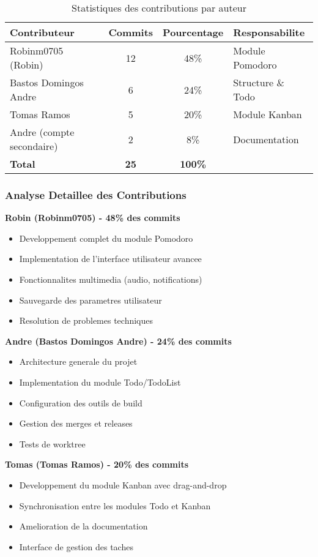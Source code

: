 \documentclass[12pt,a4paper]{article}
\begin{document}
\begin{table}[H]
\centering
\begin{tabular}{|l|c|c|l|}
\hline
\textbf{Contributeur} & \textbf{Commits} & \textbf{Pourcentage} & \textbf{Responsabilite} \\
\hline
Robinm0705 (Robin) & 12 & 48\% & Module Pomodoro \\
Bastos Domingos Andre & 6 & 24\% & Structure \& Todo \\
Tomas Ramos & 5 & 20\% & Module Kanban \\
Andre (compte secondaire) & 2 & 8\% & Documentation \\
\hline
\textbf{Total} & \textbf{25} & \textbf{100\%} & \\
\hline
\end{tabular}
\caption{Statistiques des contributions par auteur}
\label{tab:commits-stats}
\end{table}

\subsubsection{Analyse Detaillee des Contributions}

\textbf{Robin (Robinm0705) - 48\% des commits}
\begin{itemize}
    \item Developpement complet du module Pomodoro
    \item Implementation de l'interface utilisateur avancee
    \item Fonctionnalites multimedia (audio, notifications)
    \item Sauvegarde des parametres utilisateur
    \item Resolution de problemes techniques
\end{itemize}

\textbf{Andre (Bastos Domingos Andre) - 24\% des commits}
\begin{itemize}
    \item Architecture generale du projet
    \item Implementation du module Todo/TodoList
    \item Configuration des outils de build
    \item Gestion des merges et releases
    \item Tests de worktree
\end{itemize}

\textbf{Tomas (Tomas Ramos) - 20\% des commits}
\begin{itemize}
    \item Developpement du module Kanban avec drag-and-drop
    \item Synchronisation entre les modules Todo et Kanban
    \item Amelioration de la documentation
    \item Interface de gestion des taches
\end{itemize}
\end{document}
